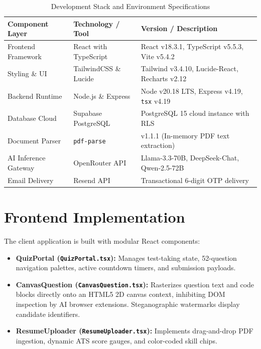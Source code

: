 \documentclass[12pt,a4paper]{report}
\begin{document}
\begin{table}[htbp]
\centering
\footnotesize
\caption{Development Stack and Environment Specifications}
\label{tab:dev_environment}
\begin{tabularx}{\textwidth}{l p{3.8cm} X}
\toprule
\textbf{Component Layer} & \textbf{Technology / Tool} & \textbf{Version / Description} \\
\midrule
Frontend Framework & React with TypeScript & React v18.3.1, TypeScript v5.5.3, Vite v5.4.2 \\
Styling \& UI & TailwindCSS \& Lucide & Tailwind v3.4.10, Lucide-React, Recharts v2.12 \\
Backend Runtime & Node.js \& Express & Node v20.18 LTS, Express v4.19, \texttt{tsx} v4.19 \\
Database Cloud & Supabase PostgreSQL & PostgreSQL 15 cloud instance with RLS \\
Document Parser & \texttt{pdf-parse} & v1.1.1 (In-memory PDF text extraction) \\
AI Inference Gateway & OpenRouter API & Llama-3.3-70B, DeepSeek-Chat, Qwen-2.5-72B \\
Email Delivery & Resend API & Transactional 6-digit OTP delivery \\
\bottomrule
\end{tabularx}
\end{table}

\section{Frontend Implementation}
The client application is built with modular React components:
\begin{itemize}
    \item \textbf{QuizPortal (\texttt{QuizPortal.tsx}):} Manages test-taking state, 52-question navigation palettes, active countdown timers, and submission payloads.
    \item \textbf{CanvasQuestion (\texttt{CanvasQuestion.tsx}):} Rasterizes question text and code blocks directly onto an HTML5 2D canvas context, inhibiting DOM inspection by AI browser extensions. Steganographic watermarks display candidate identifiers.
    \item \textbf{ResumeUploader (\texttt{ResumeUploader.tsx}):} Implements drag-and-drop PDF ingestion, dynamic ATS score gauges, and color-coded skill chips.
\end{itemize}
\end{document}
